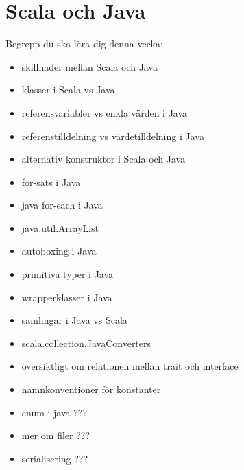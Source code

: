 \chapter{Scala och Java}\label{chapter:W11}
Begrepp du ska lära dig denna vecka:
\begin{multicols}{2}\begin{itemize}[nosep,label={$\square$},leftmargin=*]
\item skillnader mellan Scala och Java
\item klasser i Scala vs Java
\item referensvariabler vs enkla värden i Java
\item referenstilldelning vs värdetilldelning i Java
\item alternativ konstruktor i Scala och Java
\item for-sats i Java
\item java for-each i Java
\item java.util.ArrayList
\item autoboxing i Java
\item primitiva typer i Java
\item wrapperklasser i Java
\item samlingar i Java vs Scala
\item scala.collection.JavaConverters
\item översiktligt om relationen mellan trait och interface
\item namnkonventioner för konstanter
\item enum i java ???
\item mer om filer ???
\item serialisering ???\end{itemize}\end{multicols}
